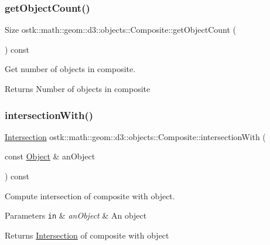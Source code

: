 \subsubsection{\texorpdfstring{get\+Object\+Count()}{getObjectCount()}}
{\footnotesize\ttfamily Size ostk\+::math\+::geom\+::d3\+::objects\+::\+Composite\+::get\+Object\+Count (\begin{DoxyParamCaption}{ }\end{DoxyParamCaption}) const}



Get number of objects in composite. 

\begin{DoxyReturn}{Returns}
Number of objects in composite 
\end{DoxyReturn}
\mbox{\label{classostk_1_1math_1_1geom_1_1d3_1_1objects_1_1_composite_a5c234652e274b4c2df015f89c2d3e90f}} 
\subsubsection{\texorpdfstring{intersection\+With()}{intersectionWith()}\hspace{0.1cm}{\footnotesize\ttfamily [1/2]}}
{\footnotesize\ttfamily \hyperlink{classostk_1_1math_1_1geom_1_1d3_1_1_intersection}{Intersection} ostk\+::math\+::geom\+::d3\+::objects\+::\+Composite\+::intersection\+With (\begin{DoxyParamCaption}\item[{const \hyperlink{classostk_1_1math_1_1geom_1_1d3_1_1_object}{Object} \&}]{an\+Object }\end{DoxyParamCaption}) const\hspace{0.3cm}{\ttfamily [virtual]}}



Compute intersection of composite with object. 


\begin{DoxyParams}[1]{Parameters}
\mbox{\tt in}  & {\em an\+Object} & An object \\
\hline
\end{DoxyParams}
\begin{DoxyReturn}{Returns}
\hyperlink{classostk_1_1math_1_1geom_1_1d3_1_1_intersection}{Intersection} of composite with object 
\end{DoxyReturn}


